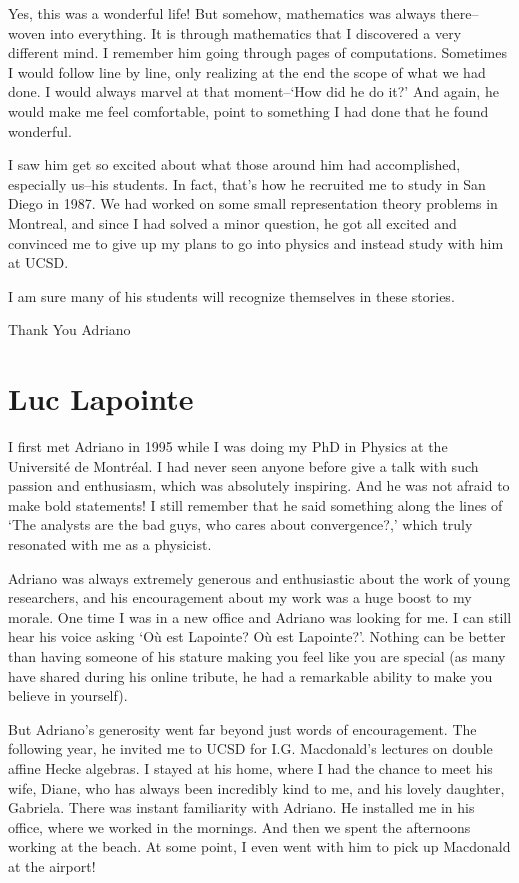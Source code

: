 \documentclass{notices}
\begin{document}
Yes, this was a wonderful life! But somehow, mathematics was always there--woven into everything. It is through mathematics that I discovered a very different mind. I remember him going through pages of computations. Sometimes I would follow line by line, only realizing at the end the scope of what we had done. I would always marvel at that moment--`How did he do it?' And again, he would make me feel comfortable, point to something I had done that he found wonderful.

I saw him get so excited about what those around him had accomplished, especially us--his students. In fact, that's how he recruited me to study in San Diego in 1987. We had worked on some small representation theory problems in Montreal, and since I had solved a minor question, he got all excited and convinced me to give up my plans to go into physics and instead study with him at UCSD.

I am sure many of his students will recognize themselves in these stories.

Thank You Adriano




\section*{Luc Lapointe}
I first met Adriano in 1995 while I was doing my PhD in Physics at the Université de Montréal.
I had never seen anyone before give a talk with such passion and enthusiasm, which was absolutely inspiring.
And he was not afraid to make bold statements! I still remember that he said something along the lines of `The analysts are the bad guys, who cares about convergence?,' which truly resonated with me as a physicist.

Adriano was always extremely generous and enthusiastic about the work of young researchers, and his encouragement about my work was a huge boost to my morale. One time I was in a new office and Adriano was looking for me.  I can still hear his voice asking `Où est Lapointe? Où est Lapointe?'.  Nothing can be better than having someone of his stature making you feel like you are special  (as many have shared during his online tribute, he had a remarkable ability to make you believe in yourself).

But Adriano's generosity went far beyond just words of encouragement. The following year, he invited me to UCSD for I.G. Macdonald's lectures on double affine Hecke algebras. I stayed at his home, where I had the chance to meet his wife, Diane, who has always been incredibly kind to me, and his lovely daughter, Gabriela.  There was instant familiarity with Adriano.  He installed me in his office, where we worked in the mornings. And then we spent the afternoons working at the beach.  At some point, I even went with him to pick up Macdonald at the airport!  
\end{document}
